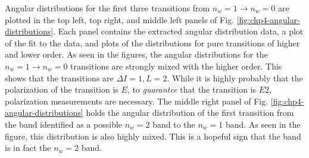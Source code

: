 Angular distributions for the first three transitions from $n_w=1\rightarrow{}n_w=0$ are plotted in the top left, top right, and middle left panels of Fig. \ref{fig:chp4-angular-distributions}. Each panel contains the extracted angular distribution data, a plot of the fit to the data, and plots of the distributions for pure transitions of higher and lower order. As seen in the figures, the angular distributions for the $n_w=1\rightarrow{}n_w=0$ transitions are strongly mixed with the higher order. This shows that the transitions are $\Delta{}I=1, L=2$. While it is highly probably that the polarization of the transition is $E$, to \emph{guarantee} that the transition is $E2$, polarization measurements are necessary. The middle right panel of Fig. \ref{fig:chp4-angular-distributions} holds the angular distribution of the first transition from the band identified as a possible $n_w=2$ band to the $n_w=1$ band. As seen in the figure, this distribution is also highly mixed. This is a hopeful sign that the band is in fact the $n_w=2$ band. 

